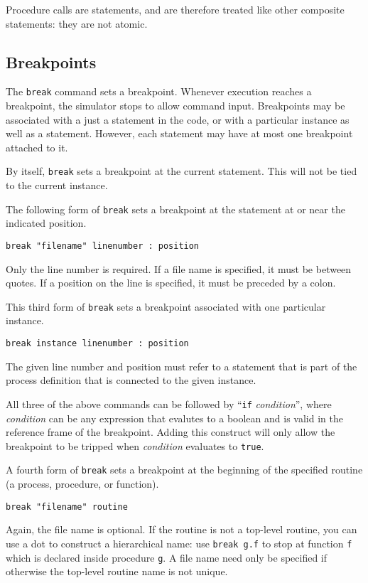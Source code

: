 Procedure calls are statements, and are therefore treated like other
composite statements: they are not atomic.


\subsection{Breakpoints}\label{sec:breakpoint}

The \verb|break| command sets a breakpoint. Whenever execution reaches a breakpoint,
the simulator stops to allow command input. Breakpoints may be associated
with a just a statement in the code, or with a particular instance as well as a
statement.  However, each statement may have at most one breakpoint attached to it.

By itself, \verb|break| sets a breakpoint at the current statement.  This will
not be tied to the current instance.

The following form of \verb|break| sets a breakpoint at the statement at or
near the indicated position.
\begin{verbatim}
break "filename" linenumber : position
\end{verbatim}
Only the line number is required. If a file name is specified,
it must be between quotes. If a position on the line is specified, it must
be preceded by a colon.

This third form of \verb|break| sets a breakpoint associated with one
particular instance.
\begin{verbatim}
break instance linenumber : position
\end{verbatim}
The given line number and position must refer to a statement that is part
of the process definition that is connected to the given instance.

All three of the above commands can be followed by ``\verb|if| {\it condition}'',
where {\it condition} can be any expression that evalutes to a boolean and is
valid in the reference frame of the breakpoint.  Adding this construct will only
allow the breakpoint to be tripped when {\it condition} evaluates to \verb|true|.

A fourth form of \verb|break| sets a breakpoint at the beginning of the
specified routine (a process, procedure, or function).
\begin{verbatim}
break "filename" routine
\end{verbatim}
Again, the file name is optional. If the routine is not a top-level routine,
you can use a dot to construct a hierarchical name: use \verb|break g.f| to stop
at function \verb|f| which is declared inside procedure \verb|g|. A file name need
only be specified if otherwise the top-level routine name is not unique.

